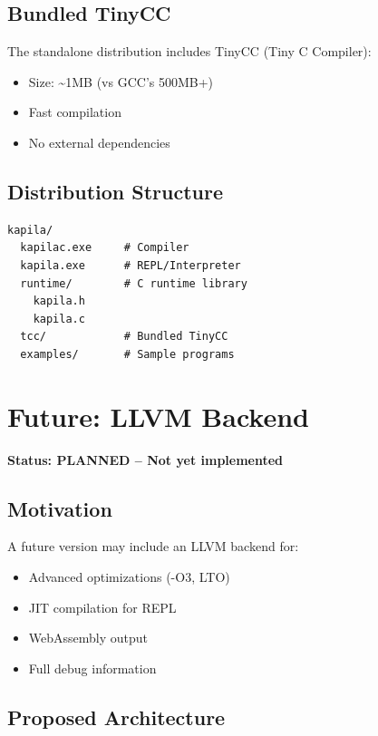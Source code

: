 \documentclass[11pt,a4paper]{report}
\begin{document}
\section{Bundled TinyCC}

The standalone distribution includes TinyCC (Tiny C Compiler):

\begin{itemize}
    \item Size: \textasciitilde1MB (vs GCC's 500MB+)
    \item Fast compilation
    \item No external dependencies
\end{itemize}

\section{Distribution Structure}

\begin{verbatim}
kapila/
  kapilac.exe     # Compiler
  kapila.exe      # REPL/Interpreter
  runtime/        # C runtime library
    kapila.h
    kapila.c
  tcc/            # Bundled TinyCC
  examples/       # Sample programs
\end{verbatim}

\chapter{Future: LLVM Backend}

\textbf{Status: PLANNED -- Not yet implemented}

\section{Motivation}

A future version may include an LLVM backend for:

\begin{itemize}
    \item Advanced optimizations (-O3, LTO)
    \item JIT compilation for REPL
    \item WebAssembly output
    \item Full debug information
\end{itemize}

\section{Proposed Architecture}
\end{document}
